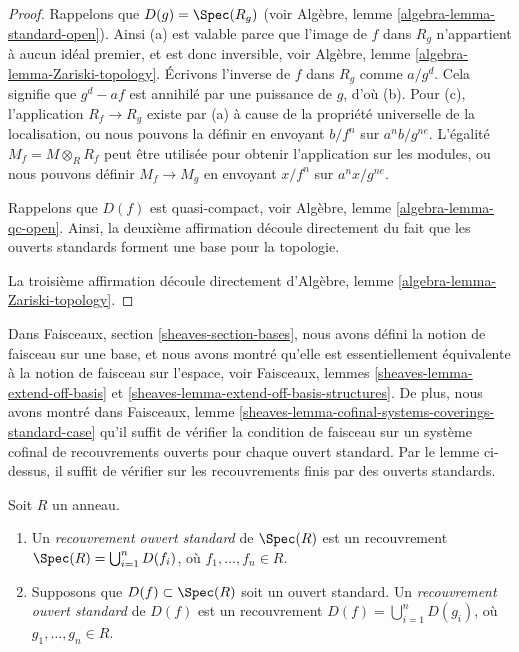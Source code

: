 \begin{proof}
Rappelons que $D(g) = \Spec(R_g)$ (voir
Algèbre, lemme \ref{algebra-lemma-standard-open}). Ainsi
(a) est valable parce que l'image
de $f$ dans $R_g$ n'appartient à aucun
idéal premier, et est donc inversible, voir Algèbre, lemme
\ref{algebra-lemma-Zariski-topology}. Écrivons l’inverse de $f$
dans $R_g$ comme $a/g^d$. Cela signifie que $g^d -
af$ est annihilé par une puissance de $g$, d’où (b). Pour (c), l’application
$R_f \to R_g$ existe par (a) à cause de la propriété universelle de la localisation,
ou nous pouvons la définir en envoyant $b/f^n$ sur
$a^nb/g^{ne}$. L’égalité $M_f = M \otimes_R R_f$ peut être utilisée
pour obtenir l’application sur les modules, ou nous
pouvons définir $M_f \to M_g$ en envoyant
$x/f^n$ sur $a^nx/g^{ne}$.

\medskip\noindent
Rappelons que $D(f)$ est quasi-compact, voir
Algèbre, lemme \ref{algebra-lemma-qc-open}.
Ainsi, la deuxième affirmation découle directement
du fait que les ouverts standards forment
une base pour la topologie.

\medskip\noindent
La troisième affirmation découle directement
d'Algèbre, lemme \ref{algebra-lemma-Zariski-topology}.
\end{proof}

\noindent
Dans Faisceaux, section \ref{sheaves-section-bases}, nous avons
défini la notion de faisceau sur une base, et nous avons montré qu'elle
est essentiellement équivalente à la notion de faisceau sur l'espace,
voir Faisceaux, lemmes \ref{sheaves-lemma-extend-off-basis} et
\ref{sheaves-lemma-extend-off-basis-structures}. De plus, nous avons
montré dans
Faisceaux, lemme \ref{sheaves-lemma-cofinal-systems-coverings-standard-case} qu'il
suffit de vérifier la condition de faisceau sur
un système cofinal de recouvrements ouverts pour chaque ouvert
standard. Par le lemme ci-dessus, il suffit de vérifier sur les
recouvrements finis par des ouverts standards.

\begin{definition}
\label{definition-standard-covering}
Soit $R$ un anneau.
\begin{enumerate}
\item Un {\it recouvrement ouvert standard} de $\Spec(R)$
est un recouvrement $\Spec(R) = \bigcup_{i = 1}^n D(f_i)$,
où $f_1, \ldots, f_n \in R$.
\item Supposons que $D(f) \subset \Spec(R)$ soit un ouvert
standard. Un {\it recouvrement ouvert standard} de $D(f)$
est un recouvrement $D(f) = \bigcup_{i = 1}^n
D(g_i)$, où $g_1, \ldots, g_n \in R$.
\end{enumerate}
\end{definition}

